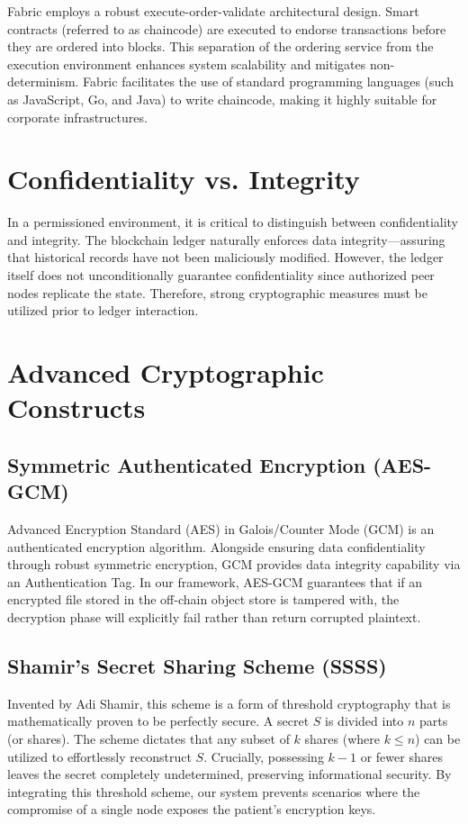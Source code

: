 Fabric employs a robust execute-order-validate architectural design. Smart contracts (referred to as chaincode) are executed to endorse transactions before they are ordered into blocks. This separation of the ordering service from the execution environment enhances system scalability and mitigates non-determinism. Fabric facilitates the use of standard programming languages (such as JavaScript, Go, and Java) to write chaincode, making it highly suitable for corporate infrastructures.

\section{Confidentiality vs. Integrity}
In a permissioned environment, it is critical to distinguish between confidentiality and integrity. The blockchain ledger naturally enforces data integrity—assuring that historical records have not been maliciously modified. However, the ledger itself does not unconditionally guarantee confidentiality since authorized peer nodes replicate the state. Therefore, strong cryptographic measures must be utilized prior to ledger interaction.

\section{Advanced Cryptographic Constructs}

\subsection{Symmetric Authenticated Encryption (AES-GCM)}
Advanced Encryption Standard (AES) in Galois/Counter Mode (GCM) is an authenticated encryption algorithm. Alongside ensuring data confidentiality through robust symmetric encryption, GCM provides data integrity capability via an Authentication Tag. In our framework, AES-GCM guarantees that if an encrypted file stored in the off-chain object store is tampered with, the decryption phase will explicitly fail rather than return corrupted plaintext.

\subsection{Shamir's Secret Sharing Scheme (SSSS)}
Invented by Adi Shamir, this scheme is a form of threshold cryptography that is mathematically proven to be perfectly secure. A secret $S$ is divided into $n$ parts (or shares). The scheme dictates that any subset of $k$ shares (where $k \le n$) can be utilized to effortlessly reconstruct $S$. Crucially, possessing $k-1$ or fewer shares leaves the secret completely undetermined, preserving informational security. By integrating this threshold scheme, our system prevents scenarios where the compromise of a single node exposes the patient's encryption keys.

